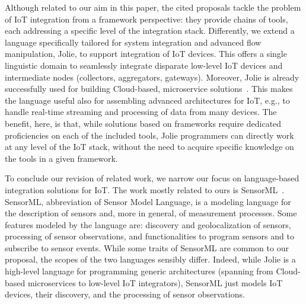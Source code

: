 Although related to our aim in this paper, the cited proposals tackle the
problem of IoT integration from a framework perspective: they provide chains of
tools, each addressing a specific level of the integration stack. Differently,
we extend a language specifically tailored for system integration and advanced
flow manipulation, Jolie, to support integration of IoT devices. This offers a
single linguistic domain to seamlessly integrate disparate low-level IoT devices
and intermediate nodes (collectors, aggregators, gateways). Moreover, Jolie is
already successfully used for building Cloud-based, microservice
solutions~\cite{GabbrielliGGMM16,MelisPGC17}. This makes the language useful
also for assembling advanced architectures for IoT, e.g., to handle real-time
streaming and processing of data from many devices. The benefit, here, is that,
while solutions based on frameworks require dedicated proficiencies on each of
the included tools, Jolie programmers can directly work at any level of the IoT
stack, without the need to acquire specific knowledge on the tools in a given
framework.

To conclude our revision of related work, we narrow our focus on language-based
integration solutions for IoT. The work mostly related to ours is
SensorML~\cite{SensorML}.
%
SensorML, abbreviation of Sensor Model Language, is a modeling
language for the description of sensors and, more in general, of measurement
processes. Some features modeled by the language are: discovery and
geolocalization of sensors, processing of sensor observations, and
functionalities to program sensors and to subscribe to sensor events.
%
While some traits of SensorML are common to our proposal, the scopes of the two
languages sensibly differ. Indeed, while Jolie is a high-level language for
programming generic architectures (spanning from Cloud-based microservices to
low-level IoT integrators), SensorML just models IoT devices, their discovery,
and the processing of sensor observations.

%
